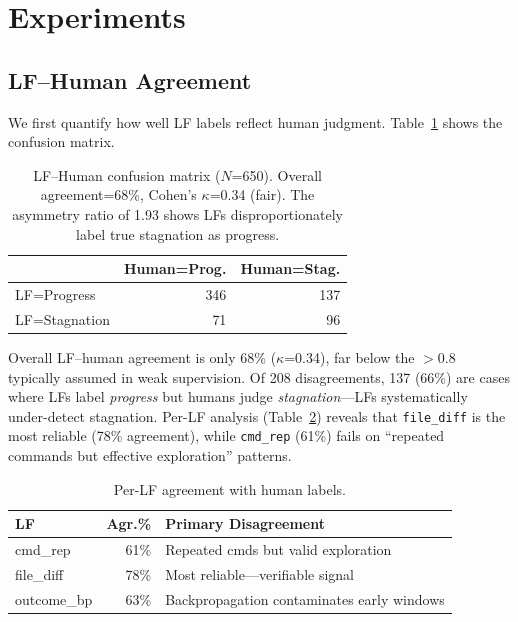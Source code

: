 \documentclass[11pt,a4paper]{article}
\begin{document}
\section{Experiments}
\label{sec:experiments}

\subsection{LF--Human Agreement}
\label{sec:lf-agreement}

We first quantify how well LF labels reflect human judgment. Table~\ref{tab:confusion} shows the confusion matrix.

\begin{table}[t]
\centering
\small
\begin{tabular}{lrr}
\toprule
& \textbf{Human=Prog.} & \textbf{Human=Stag.} \\
\midrule
LF=Progress & 346 & 137 \\
LF=Stagnation & 71 & 96 \\
\bottomrule
\end{tabular}
\caption{LF--Human confusion matrix ($N$=650). Overall agreement=68\%, Cohen's $\kappa$=0.34 (fair). The asymmetry ratio of 1.93 shows LFs disproportionately label true stagnation as progress.}
\label{tab:confusion}
\end{table}

Overall LF--human agreement is only 68\% ($\kappa$=0.34), far below the $>$0.8 typically assumed in weak supervision.
Of 208 disagreements, 137 (66\%) are cases where LFs label \emph{progress} but humans judge \emph{stagnation}---LFs systematically under-detect stagnation.
Per-LF analysis (Table~\ref{tab:per-lf}) reveals that \texttt{file\_diff} is the most reliable (78\% agreement), while \texttt{cmd\_rep} (61\%) fails on ``repeated commands but effective exploration'' patterns.

\begin{table}[t]
\centering
\small
\begin{tabular}{lrl}
\toprule
\textbf{LF} & \textbf{Agr.\%} & \textbf{Primary Disagreement} \\
\midrule
cmd\_rep & 61\% & Repeated cmds but valid exploration \\
file\_diff & 78\% & Most reliable---verifiable signal \\
outcome\_bp & 63\% & Backpropagation contaminates early windows \\
\bottomrule
\end{tabular}
\caption{Per-LF agreement with human labels.}
\label{tab:per-lf}
\end{table}
\end{document}
